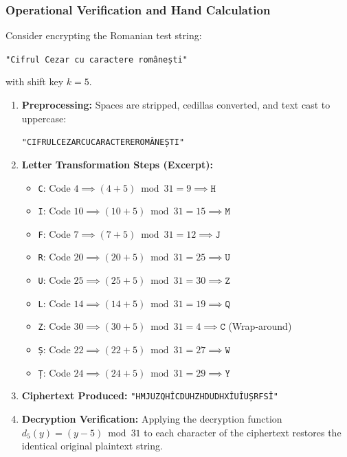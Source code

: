 \documentclass{labreport}
\begin{document}
\subsubsection{Operational Verification and Hand Calculation}
Consider encrypting the Romanian test string:
\begin{center}
    \texttt{"Cifrul Cezar cu caractere românești"}
\end{center}
with shift key $k = 5$.
\begin{enumerate}[leftmargin=*]
    \item \textbf{Preprocessing:} Spaces are stripped, cedillas converted, and text cast to uppercase:
    \begin{center}
        \texttt{"CIFRULCEZARCUCARACTEREROMÂNEȘTI"}
    \end{center}
    \item \textbf{Letter Transformation Steps (Excerpt):}
    \begin{itemize}[noitemsep, topsep=2pt]
        \item \texttt{C}: Code $4 \implies (4 + 5) \bmod 31 = 9 \implies \texttt{H}$
        \item \texttt{I}: Code $10 \implies (10 + 5) \bmod 31 = 15 \implies \texttt{M}$
        \item \texttt{F}: Code $7 \implies (7 + 5) \bmod 31 = 12 \implies \texttt{J}$
        \item \texttt{R}: Code $20 \implies (20 + 5) \bmod 31 = 25 \implies \texttt{U}$
        \item \texttt{U}: Code $25 \implies (25 + 5) \bmod 31 = 30 \implies \texttt{Z}$
        \item \texttt{L}: Code $14 \implies (14 + 5) \bmod 31 = 19 \implies \texttt{Q}$
        \item \texttt{Z}: Code $30 \implies (30 + 5) \bmod 31 = 4 \implies \texttt{C}$ (Wrap-around)
        \item \texttt{Ș}: Code $22 \implies (22 + 5) \bmod 31 = 27 \implies \texttt{W}$
        \item \texttt{Ț}: Code $24 \implies (24 + 5) \bmod 31 = 29 \implies \texttt{Y}$
    \end{itemize}
    \item \textbf{Ciphertext Produced:} \texttt{"HMJUZQHÎCDUHZHDUDHXÎUÎUȘRFSÎ"}
    \item \textbf{Decryption Verification:} Applying the decryption function $d_5(y) = (y - 5) \bmod 31$ to each character of the ciphertext restores the identical original plaintext string.
\end{enumerate}
\end{document}
